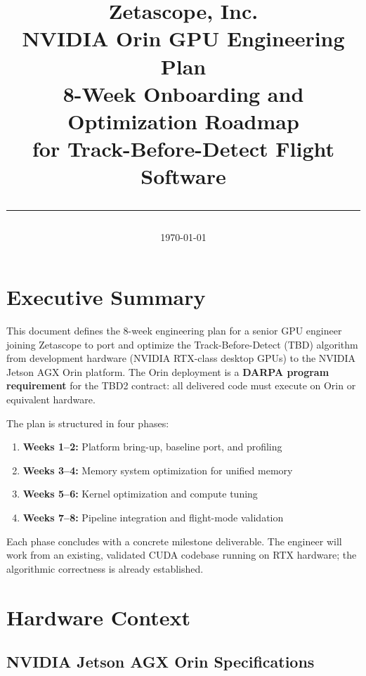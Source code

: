\documentclass[11pt,letterpaper]{article}
\title{%
    \vspace{-1cm}
    {\Large\textcolor{zetablue}{\textbf{Zetascope, Inc.}}}\\[0.3cm]
    {\LARGE NVIDIA Orin GPU Engineering Plan}\\[0.2cm]
    {\Large 8-Week Onboarding and Optimization Roadmap\\
    for Track-Before-Detect Flight Software}\\[0.3cm]
    \rule{\textwidth}{0.4pt}
}
\author{}
\date{\today}
\begin{document}
\maketitle
\thispagestyle{fancy}

\tableofcontents
\newpage

\section{Executive Summary}

This document defines the 8-week engineering plan for a senior GPU
engineer joining Zetascope to port and optimize the Track-Before-Detect
(TBD) algorithm from development hardware (NVIDIA RTX-class desktop GPUs)
to the NVIDIA Jetson AGX Orin platform. The Orin deployment is a
\textbf{DARPA program requirement} for the TBD2 contract: all delivered
code must execute on Orin or equivalent hardware.

The plan is structured in four phases:
\begin{enumerate}[leftmargin=2em]
    \item \textbf{Weeks 1--2:} Platform bring-up, baseline port, and profiling
    \item \textbf{Weeks 3--4:} Memory system optimization for unified memory
    \item \textbf{Weeks 5--6:} Kernel optimization and compute tuning
    \item \textbf{Weeks 7--8:} Pipeline integration and flight-mode validation
\end{enumerate}

Each phase concludes with a concrete milestone deliverable. The engineer
will work from an existing, validated CUDA codebase running on RTX
hardware; the algorithmic correctness is already established.

\section{Hardware Context}
\label{sec:hardware}

\subsection{NVIDIA Jetson AGX Orin Specifications}
\end{document}
